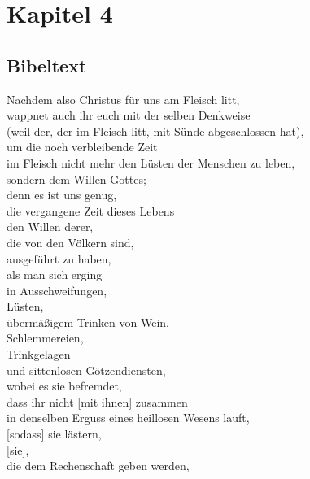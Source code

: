 \section{Kapitel 4}
\subsection{Bibeltext}


    Nachdem also Christus für uns am Fleisch litt, \\
        wappnet auch ihr euch mit der selben Denkweise \\
            (weil der, der im Fleisch litt, mit Sünde abgeschlossen hat),\\
            um die noch verbleibende Zeit \\
            im Fleisch nicht mehr den Lüsten der Menschen zu leben, \\
                sondern dem Willen Gottes;\\
            denn es ist uns genug, \\
                die vergangene Zeit dieses Lebens \\
                den Willen derer, \\
                die von den Völkern sind, \\
                ausgeführt zu haben, \\
                als man sich erging \\
                    in Ausschweifungen, \\
                    Lüsten, \\
                    übermäßigem Trinken von Wein, \\
                    Schlemmereien, \\
                    Trinkgelagen \\
                    und sittenlosen Götzendiensten,\\
            wobei es sie befremdet, \\
                dass ihr nicht [mit ihnen] zusammen \\
                in denselben Erguss eines heillosen Wesens lauft, \\
            [sodass] sie lästern,\\
                [sie], \\
                die dem Rechenschaft geben werden, \\
